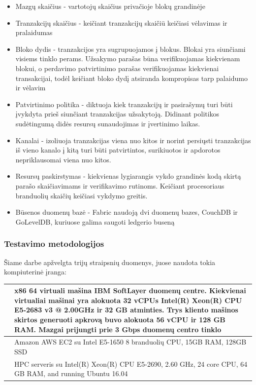 \documentclass{VUMIFPSkursinis}
\begin{document}
			\begin{itemize}
				\item{Mazgų skaičius - vartotojų skaičius privačioje blokų grandinėje}
				\item{Tranzakcijų skaičius - keičiant tranzakcijų skaičiū keičiasi vėlavimas ir pralaidumas}
				\item{Bloko dydis - tranzakcijos yra sugrupuojamos į blokus. Blokai yra siunčiami visiems tinklo perams. Užsakymo parašas 
būna verifikuojamas kiekvienam blokui, o perdavimo patvirtinimo parašas verifikuojamas kiekvienai transakcijai, todėl keičiant bloko dydį atsiranda kompropisas tarp palaidumo ir vėlavim}
				\item{Patvirtinimo politika - diktuoja kiek tranzakcijų ir pasirašymų turi būti įvykdyta prieš siunčiant tranzakcijas užsakytoją. Didinant politikos sudėtingumą didės resursų sunaudojimas ir įvertinimo laikas.}
				\item{Kanalai - izoliuoja tranzakcijas viena nuo kitos ir norint persiųsti tranzakcijas iš vieno kanalo į kitą turi būti patvirtintos, surikiuotos ir apdorotos nepriklausomai viena nuo kitos.}
				\item{Resursų paskirstymas - kiekvienas lygiarangis vykdo grandinės kodą skirtą parašo skaičiavimams ir verifikavimo rutinoms. Keičiant procesoriaus branduolių skaičių keičiasi vykdymo greitis.}
				\item{Būsenos duomenų bazė - Fabric naudoją dvi duomenų bazes, CouchDB ir GoLevelDB, kuriuose galima saugoti ledgerio buseną}
			\end{itemize}

		\subsubsection{Testavimo metodologijos}
			Šiame darbe apžvelgta trijų straipsnių duomenys, juose naudota tokia kompiuterinė įranga:
\begin{center}
\begin{tabular}{ | m{5em} | m{10cm}| } 
\hline
\cite{IMBResearch}& x86 64 virtuali mašina IBM SoftLayer duomenų centre. 
Kiekvienai virtualiai mašinai yra alokuota 32 vCPUs  Intel(R) Xeon(R)
CPU E5-2683 v3 @ 2.00GHz ir 32 GB atminties. Trys kliento mašinos skirtos generuoti apkrovą buvo alokuota
 56 vCPU ir 128 GB RAM. Mazgai prijungti prie 3 Gbps duomenų centro tinklo  \\ 
\hline
 \cite{ThailandPerf}& Amazon AWS EC2
 su Intel E5-1650 8 branduolių CPU,
15GB RAM, 128GB SSD  \\ 
\hline
 \cite{ShaFabPerf}& HPC serveris
su Intel(R) Xeon(R) CPU E5-2690, 2.60 GHz, 24 core
CPU, 64 GB RAM, and running Ubuntu 16.04  \\ 
\hline
\end{tabular}
\end{center}
\end{document}
